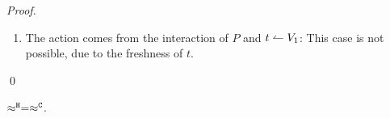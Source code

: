 \begin{proof}
\begin{enumerate}[1.]
\begin{enumerate}
				\item The action comes from the interaction of $P$ and $t \leftharpoonup V_1$: This case is not possible, due to the freshness of $t$.
				\end{enumerate}
	\end{enumerate}
	\qed
\end{proof}



\begin{lemma}
	\label{app:lem:wb_eq_wbf}
	$\approx^\mathtt{H} = \approx^\mathtt{C}$.
\end{lemma}

